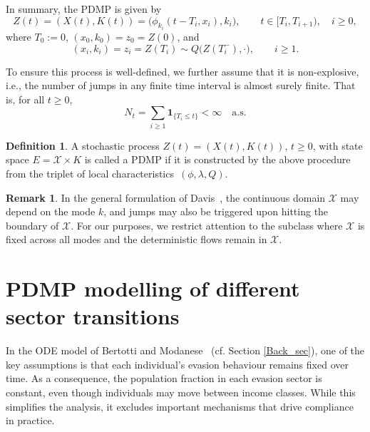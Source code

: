 \documentclass[11pt]{article}
\theoremstyle{plain}
\theoremstyle{definition}
\newtheorem{definition}{Definition}
\newtheorem{remark}{Remark}
\newcommand{\1}{\mathbf{1}}
\begin{document}
In summary, the PDMP is given by
\begin{equation*}
    Z(t)=(X(t),K(t))=\big( \phi_{k_i}(t-T_i, x_i), k_i\big), \qquad t \in [T_i, T_{i+1}), \quad i\geq 0,
\end{equation*}
where $T_0:=0$, $(x_0, k_0)=z_0=Z(0)$, and
\begin{equation*}
 (x_{i},k_{i})=z_{i}=Z({T_{i}}) \sim Q\big(Z({T_{i}^-}), \cdot\big), \qquad i \geq 1.
\end{equation*}

To ensure this process is well-defined, we further assume that it is non-explosive, i.e., the number of jumps in any finite time interval is almost surely finite. That is, for all $t \ge 0$,
\begin{equation*}
  N_t = \sum_{i \ge 1} \mathbf{1}_{\{T_i \le t\}} < \infty \quad \text{a.s}.
\end{equation*}

\begin{definition}
A stochastic process $Z(t)=(X(t),K(t))$, ${t \geq 0}$, with state space $E = \mathcal{X} \times K$ is called a PDMP if it is constructed by the above procedure from the triplet of local characteristics~$(\phi, \lambda, Q)$.
\end{definition}

\begin{remark}
In the general formulation of Davis~\cite{davis1984piecewise}, the continuous domain $\mathcal{X}$ may depend on the mode $k$, and jumps may also be triggered upon hitting the boundary of $\mathcal{X}$. For our purposes, we restrict attention to the subclass where $\mathcal{X}$ is fixed across all modes and the deterministic flows remain in $\mathcal{X}$.
\end{remark}

\section{PDMP modelling of different sector transitions}
\label{PDMP_form}


In the ODE model of Bertotti and Modanese~\cite{bertotti2018mathematical} (cf. Section \ref{Back_sec}), one of the key
assumptions is that each individual’s evasion behaviour remains fixed over time. As a consequence, the population fraction in each evasion sector is constant, even though individuals may move between income classes. While this simplifies the analysis, it excludes important mechanisms that drive compliance in practice.
\end{document}
